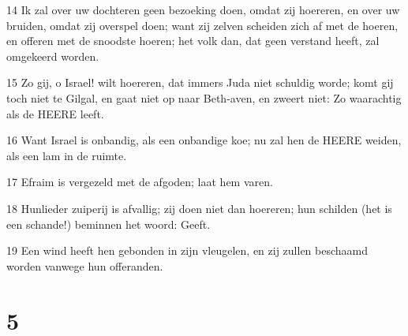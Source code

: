 \par 14 Ik zal over uw dochteren geen bezoeking doen, omdat zij hoereren, en over uw bruiden, omdat zij overspel doen; want zij zelven scheiden zich af met de hoeren, en offeren met de snoodste hoeren; het volk dan, dat geen verstand heeft, zal omgekeerd worden.
\par 15 Zo gij, o Israel! wilt hoereren, dat immers Juda niet schuldig worde; komt gij toch niet te Gilgal, en gaat niet op naar Beth-aven, en zweert niet: Zo waarachtig als de HEERE leeft.
\par 16 Want Israel is onbandig, als een onbandige koe; nu zal hen de HEERE weiden, als een lam in de ruimte.
\par 17 Efraim is vergezeld met de afgoden; laat hem varen.
\par 18 Hunlieder zuiperij is afvallig; zij doen niet dan hoereren; hun schilden (het is een schande!) beminnen het woord: Geeft.
\par 19 Een wind heeft hen gebonden in zijn vleugelen, en zij zullen beschaamd worden vanwege hun offeranden.

\chapter{5}


